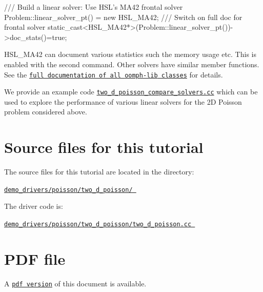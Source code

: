 \begin{DoxyCode}
\textcolor{comment}{/// Build a linear solver: Use HSL's MA42 frontal solver}
\textcolor{comment}{}Problem::linear\_solver\_pt() = \textcolor{keyword}{new} HSL\_MA42;
\textcolor{comment}{}
\textcolor{comment}{/// Switch on full doc for frontal solver}
\textcolor{comment}{}\textcolor{keyword}{static\_cast<}HSL\_MA42*\textcolor{keyword}{>}(Problem::linear\_solver\_pt())->doc\_stats()=\textcolor{keyword}{true};
\end{DoxyCode}


{\ttfamily H\+S\+L\+\_\+\+M\+A42} can document various statistics such the memory usage etc. This is enabled with the second command. Other solvers have similar member functions. See the \href{../../../the_data_structure/html/index.html}{\tt full documentation of all {\ttfamily oomph-\/lib} classes} for details.

We provide an example code \href{../../../../demo_drivers/poisson/two_d_poisson/two_d_poisson_compare_solvers.cc}{\tt two\+\_\+d\+\_\+poisson\+\_\+compare\+\_\+solvers.\+cc} which can be used to explore the performance of various linear solvers for the 2D Poisson problem considered above.



 

\hypertarget{index_sources}{}\section{Source files for this tutorial}\label{index_sources}

\begin{DoxyItemize}
\item The source files for this tutorial are located in the directory\+: \begin{center} \href{../../../../demo_drivers/poisson/two_d_poisson/}{\tt demo\+\_\+drivers/poisson/two\+\_\+d\+\_\+poisson/ } \end{center} 
\item The driver code is\+: \begin{center} \href{../../../../demo_drivers/poisson/two_d_poisson/two_d_poisson.cc}{\tt demo\+\_\+drivers/poisson/two\+\_\+d\+\_\+poisson/two\+\_\+d\+\_\+poisson.\+cc } \end{center} 
\end{DoxyItemize}



 

 \hypertarget{index_pdf}{}\section{P\+D\+F file}\label{index_pdf}
A \href{../latex/refman.pdf}{\tt pdf version} of this document is available. 
